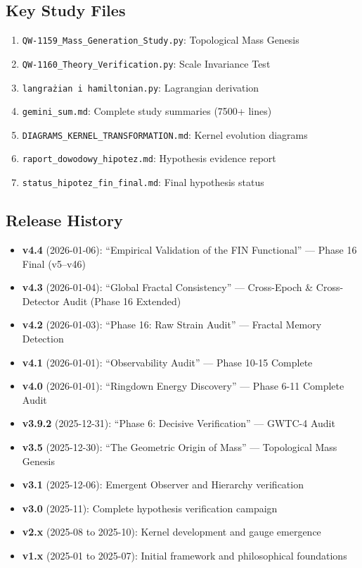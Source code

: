 \documentclass[11pt,a4paper]{book}
\theoremstyle{remark}
\begin{document}
\subsection{Key Study Files}

\begin{enumerate}
    \item \texttt{QW-1159\_Mass\_Generation\_Study.py}: Topological Mass Genesis
    \item \texttt{QW-1160\_Theory\_Verification.py}: Scale Invariance Test
    \item \texttt{langrażian i hamiltonian.py}: Lagrangian derivation
    \item \texttt{gemini\_sum.md}: Complete study summaries (7500+ lines)
    \item \texttt{DIAGRAMS\_KERNEL\_TRANSFORMATION.md}: Kernel evolution diagrams
    \item \texttt{raport\_dowodowy\_hipotez.md}: Hypothesis evidence report
    \item \texttt{status\_hipotez\_fin\_final.md}: Final hypothesis status
\end{enumerate}

\subsection{Release History}

\begin{itemize}
    \item \textbf{v4.4} (2026-01-06): ``Empirical Validation of the FIN Functional'' --- Phase 16 Final (v5--v46)
    \item \textbf{v4.3} (2026-01-04): ``Global Fractal Consistency'' --- Cross-Epoch \& Cross-Detector Audit (Phase 16 Extended)
    \item \textbf{v4.2} (2026-01-03): ``Phase 16: Raw Strain Audit'' --- Fractal Memory Detection
    \item \textbf{v4.1} (2026-01-01): ``Observability Audit'' --- Phase 10-15 Complete
    \item \textbf{v4.0} (2026-01-01): ``Ringdown Energy Discovery'' --- Phase 6-11 Complete Audit
    \item \textbf{v3.9.2} (2025-12-31): ``Phase 6: Decisive Verification'' --- GWTC-4 Audit
    \item \textbf{v3.5} (2025-12-30): ``The Geometric Origin of Mass'' --- Topological Mass Genesis
    \item \textbf{v3.1} (2025-12-06): Emergent Observer and Hierarchy verification
    \item \textbf{v3.0} (2025-11): Complete hypothesis verification campaign
    \item \textbf{v2.x} (2025-08 to 2025-10): Kernel development and gauge emergence
    \item \textbf{v1.x} (2025-01 to 2025-07): Initial framework and philosophical foundations
\end{itemize}
\end{document}

